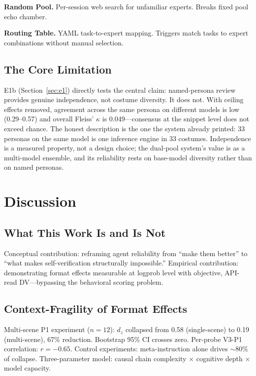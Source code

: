 \documentclass[11pt]{article}
\begin{document}
\textbf{Random Pool.} Per-session web search for unfamiliar experts. Breaks
fixed pool echo chamber.

\textbf{Routing Table.} YAML task-to-expert mapping. Triggers match tasks to
expert combinations without manual selection.

\subsection{The Core Limitation}

E1b (Section~\ref{sec:e1}) directly tests the central claim: named-persona
review provides genuine independence, not costume diversity. It does not.
With ceiling effects removed, agreement across the same persona on different
models is low (0.29--0.57) and overall Fleiss' $\kappa$ is 0.049---consensus
at the snippet level does not exceed chance. The honest description is the one
the system already printed: 33 personas on the same model is one inference
engine in 33 costumes. Independence is a measured property, not a design
choice; the dual-pool system's value is as a multi-model ensemble, and its
reliability rests on base-model diversity rather than on named personas.

\section{Discussion}

\subsection{What This Work Is and Is Not}

Conceptual contribution: reframing agent reliability from ``make them better''
to ``what makes self-verification structurally impossible.'' Empirical
contribution: demonstrating format effects measurable at logprob level with
objective, API-read DV---bypassing the behavioral scoring problem.

\subsection{Context-Fragility of Format Effects}

Multi-scene P1 experiment ($n=12$): $d_z$ collapsed from 0.58 (single-scene) to
0.19 (multi-scene), 67\% reduction. Bootstrap 95\% CI crosses zero. Per-probe
V3-P1 correlation: $r=-0.65$. Control experiments: meta-instruction alone
drives $\sim$80\% of collapse. Three-parameter model: causal chain complexity
$\times$ cognitive depth $\times$ model capacity.
\end{document}
